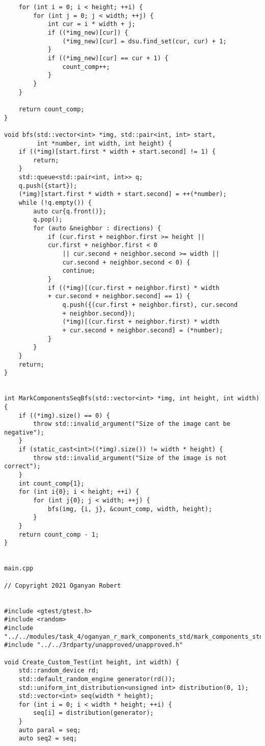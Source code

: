 \documentclass{report}
\begin{document}
\begin{lstlisting}
    for (int i = 0; i < height; ++i) {
        for (int j = 0; j < width; ++j) {
            int cur = i * width + j;
            if ((*img_new)[cur]) {
                (*img_new)[cur] = dsu.find_set(cur, cur) + 1;
            }
            if ((*img_new)[cur] == cur + 1) {
                count_comp++;
            }
        }
    }

    return count_comp;
}

void bfs(std::vector<int> *img, std::pair<int, int> start,
         int *number, int width, int height) {
    if ((*img)[start.first * width + start.second] != 1) {
        return;
    }
    std::queue<std::pair<int, int>> q;
    q.push({start});
    (*img)[start.first * width + start.second] = ++(*number);
    while (!q.empty()) {
        auto cur{q.front()};
        q.pop();
        for (auto &neighbor : directions) {
            if (cur.first + neighbor.first >= height ||
            cur.first + neighbor.first < 0
                || cur.second + neighbor.second >= width ||
                cur.second + neighbor.second < 0) {
                continue;
            }
            if ((*img)[(cur.first + neighbor.first) * width
            + cur.second + neighbor.second] == 1) {
                q.push({(cur.first + neighbor.first), cur.second
                + neighbor.second});
                (*img)[(cur.first + neighbor.first) * width
                + cur.second + neighbor.second] = (*number);
            }
        }
    }
    return;
}


int MarkComponentsSeqBfs(std::vector<int> *img, int height, int width) {
    if ((*img).size() == 0) {
        throw std::invalid_argument("Size of the image cant be negative");
    }
    if (static_cast<int>((*img).size()) != width * height) {
        throw std::invalid_argument("Size of the image is not correct");
    }
    int count_comp{1};
    for (int i{0}; i < height; ++i) {
        for (int j{0}; j < width; ++j) {
            bfs(img, {i, j}, &count_comp, width, height);
        }
    }
    return count_comp - 1;
}


main.cpp

// Copyright 2021 Oganyan Robert


#include <gtest/gtest.h>
#include <random>
#include "../../modules/task_4/oganyan_r_mark_components_std/mark_components_std.h"
#include "../../3rdparty/unapproved/unapproved.h"

void Create_Custom_Test(int height, int width) {
    std::random_device rd;
    std::default_random_engine generator(rd());
    std::uniform_int_distribution<unsigned int> distribution(0, 1);
    std::vector<int> seq(width * height);
    for (int i = 0; i < width * height; ++i) {
        seq[i] = distribution(generator);
    }
    auto paral = seq;
    auto seq2 = seq;


\end{lstlisting}
\end{document}
